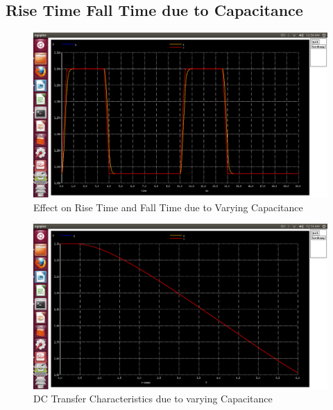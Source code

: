 \documentclass[12pt,a4paper]{article}
\begin{document}
\begin{center}
\subsection{Rise Time Fall Time due to Capacitance}
\begin{figure}[!ht]
\centering
\includegraphics[scale=0.37]{lab2_risefalltime_dueto_vary_Capacitance.png}
\caption[Short]{Effect on Rise Time and Fall Time due to Varying Capacitance}
\end{figure}

\begin{figure}[!ht]
\centering
\includegraphics[scale=0.37]{lab2_dctranferchar_on_C_vary.png}
\caption[Short]{DC Transfer Characteristics due to varying Capacitance}
\end{figure}



\end{center}
\end{document}
